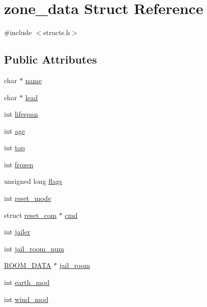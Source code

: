 \hypertarget{structzone__data}{\section{zone\-\_\-data Struct Reference}
\label{structzone__data}
}


{\ttfamily \#include $<$structs.\-h$>$}

\subsection*{Public Attributes}
\begin{DoxyCompactItemize}
\item 
char $\ast$ \hyperlink{structzone__data_aa44d6c4fc1b3364774fb67e528921049}{name}
\item 
char $\ast$ \hyperlink{structzone__data_af064c07ef1bcc6651ff1e7277d43a094}{lead}
\item 
int \hyperlink{structzone__data_a394287a0eed95620a43f136591f9e625}{lifespan}
\item 
int \hyperlink{structzone__data_a2bf69f347f8b44b42e9764adfae64c05}{age}
\item 
int \hyperlink{structzone__data_a52c145458a8411e424e7c92f963f794b}{top}
\item 
int \hyperlink{structzone__data_afa13f578b59e814f39aa7409739f63c4}{frozen}
\item 
unsigned long \hyperlink{structzone__data_a721d4d33a3acb9069abf285f63675a76}{flags}
\item 
int \hyperlink{structzone__data_a7daf7b5ca0284906e38b1c34ee1fb00b}{reset\-\_\-mode}
\item 
struct \hyperlink{structreset__com}{reset\-\_\-com} $\ast$ \hyperlink{structzone__data_af2c89353f1a217211fd7b77902a268e8}{cmd}
\item 
int \hyperlink{structzone__data_a4817d3ccd878715463a2ed9fb75102af}{jailer}
\item 
int \hyperlink{structzone__data_af7b3a36af05a0812c8b47a1f182d6a9b}{jail\-\_\-room\-\_\-num}
\item 
\hyperlink{room_8h_aede519ef65d80b5242a4a28b69d5e097}{R\-O\-O\-M\-\_\-\-D\-A\-T\-A} $\ast$ \hyperlink{structzone__data_a23f5d6652124b66fa5e7ff7f7db0fb20}{jail\-\_\-room}
\item 
int \hyperlink{structzone__data_addc799fff91eea2134a40f0cddc3af5b}{earth\-\_\-mod}
\item 
int \hyperlink{structzone__data_a33f2397ced886d2f2df2a8e3b3f36cf1}{wind\-\_\-mod}
\item 

\end{DoxyCompactItemize}
